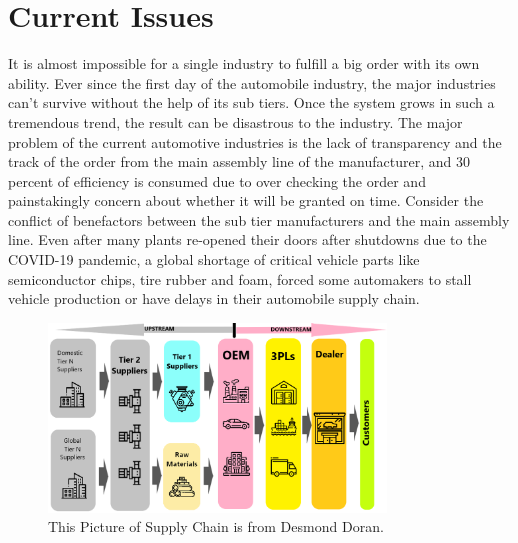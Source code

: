 \documentclass[12pt]{article}
\begin{document}
\section{Current Issues} \label{issues}
It is almost impossible for a single industry to fulfill a big order with its own ability. Ever since the first day of the automobile industry, the major industries can't survive without the help of its sub tiers. Once the system grows in such a tremendous trend, the result can be disastrous to the industry.\cite{edi} The major problem of the current automotive industries is the lack of transparency and the track of the order from the main assembly line of the manufacturer, and 30 percent of efficiency is consumed due to over checking the order and painstakingly concern about whether it will be granted on time. Consider the conflict of benefactors between the sub tier manufacturers and the main assembly line. Even after many plants re-opened their doors after shutdowns due to the COVID-19 pandemic, a global shortage of critical vehicle parts like semiconductor chips, tire rubber and foam, forced some automakers to stall vehicle production or have delays in their automobile supply chain. 
\begin{figure}
\centering
\includegraphics[width=0.8\textwidth]{tiers.png}
\caption{\label{fig:tiers}This Picture of Supply Chain is from Desmond Doran.}
\end{figure}
\end{document}
